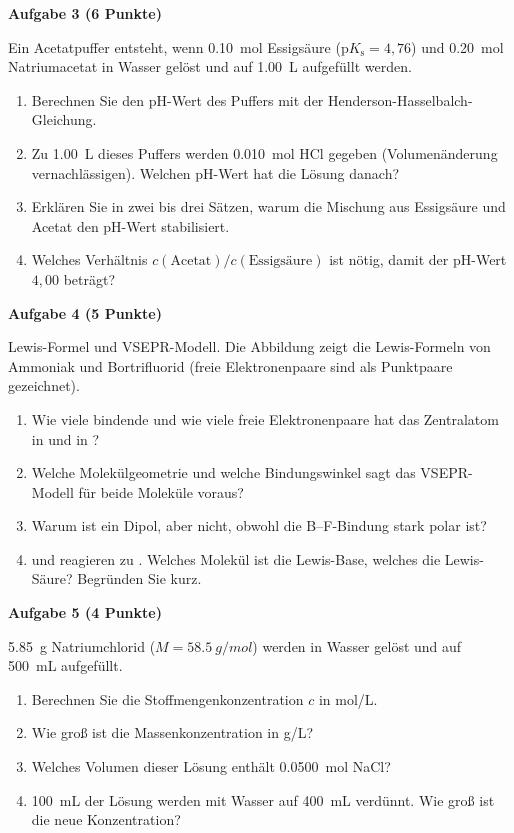 \documentclass[11pt,a4paper]{article}
\newcommand{\aufgabe}[2]{\bigskip\par\textbf{Aufgabe #1 (#2)}\par\nopagebreak\smallskip}
\begin{document}
\aufgabe{3}{6 Punkte}
Ein Acetatpuffer entsteht, wenn \qty{0.10}{mol} Essigsäure ($\mathrm{p}K_\mathrm{s} = 4{,}76$) und
\qty{0.20}{mol} Natriumacetat in Wasser gelöst und auf \qty{1.00}{L} aufgefüllt werden.
\begin{enumerate}
  \item Berechnen Sie den pH-Wert des Puffers mit der Henderson-Hasselbalch-Gleichung.
  \item Zu \qty{1.00}{L} dieses Puffers werden \qty{0.010}{mol} HCl gegeben (Volumenänderung
        vernachlässigen). Welchen pH-Wert hat die Lösung danach?
  \item Erklären Sie in zwei bis drei Sätzen, warum die Mischung aus Essigsäure und Acetat den pH-Wert
        stabilisiert.
  \item Welches Verhältnis $c(\text{Acetat})/c(\text{Essigsäure})$ ist nötig, damit der pH-Wert $4{,}00$
        beträgt?
\end{enumerate}

\aufgabe{4}{5 Punkte}
Lewis-Formel und VSEPR-Modell. Die Abbildung zeigt die Lewis-Formeln von Ammoniak und Bortrifluorid
(freie Elektronenpaare sind als Punktpaare gezeichnet).
\begin{center}
\hspace{4em}
\end{center}
\begin{enumerate}
  \item Wie viele bindende und wie viele freie Elektronenpaare hat das Zentralatom in  und in
        ?
  \item Welche Molekülgeometrie und welche Bindungswinkel sagt das VSEPR-Modell für beide Moleküle voraus?
  \item Warum ist  ein Dipol,  aber nicht, obwohl die B--F-Bindung stark polar ist?
  \item {} und  reagieren zu . Welches Molekül ist die Lewis-Base, welches
        die Lewis-Säure? Begründen Sie kurz.
\end{enumerate}

\aufgabe{5}{4 Punkte}
\qty{5.85}{g} Natriumchlorid ($M = \qty{58.5}{g/mol}$) werden in Wasser gelöst und auf \qty{500}{mL}
aufgefüllt.
\begin{enumerate}
  \item Berechnen Sie die Stoffmengenkonzentration $c$ in mol/L.
  \item Wie groß ist die Massenkonzentration in g/L?
  \item Welches Volumen dieser Lösung enthält \qty{0.0500}{mol} NaCl?
  \item \qty{100}{mL} der Lösung werden mit Wasser auf \qty{400}{mL} verdünnt. Wie groß ist die neue
        Konzentration?
\end{enumerate}
\end{document}
